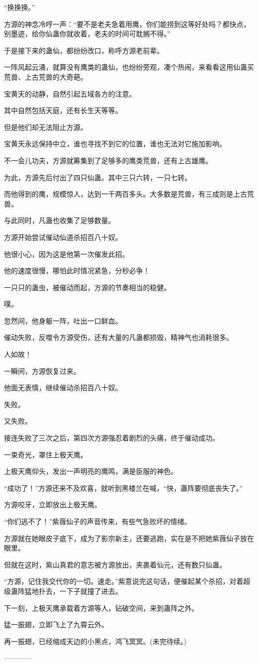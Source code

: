 \begin{this_body}
“换换换。”

方源的神念冷哼一声：“要不是老夫急着用鹰，你们能捞到这等好处吗？都快点，别墨迹，给你仙蛊你就收着，老夫的时间可耽搁不得。”

于是接下来的蛊仙，都纷纷改口，称呼方源老前辈。

一阵风起云涌，就算没有鹰类的蛊仙，也纷纷旁观，凑个热闹，来看看这用仙蛊买荒兽、上古荒兽的大奇葩。

宝黄天的动静，自然引起五域各方的注意。

其中自然包括天庭，还有长生天等等。

但是他们却无法阻止方源。

宝黄天永远保持中立，谁也寻找不到它的位置，谁也无法对它施加影响。

不一会儿功夫，方源就筹集到了足够多的鹰类荒兽，还有上古雄鹰。

为此，方源先后付出了四只仙蛊。其中三只六转，一只七转。

而他得到的鹰，规模惊人，达到一千两百多头。大多数是荒兽，有三成则是上古荒兽。

与此同时，凡蛊也收集了足够数量。

方源开始尝试催动仙道杀招百八十奴。

他很小心，因为这是他第一次催发此招。

他的速度很慢，哪怕此时情况紧急，分秒必争！

一只只的蛊虫，被催动而起，方源的节奏相当的稳健。

噗。

忽然间，他身躯一阵，吐出一口鲜血。

催动失败，反噬令方源受伤，还有大量的凡蛊都损毁，精神气也消耗很多。

人如故！

一瞬间，方源恢复过来。

他面无表情，继续催动杀招百八十奴。

失败。

又失败。

接连失败了三次之后，第四次方源强忍着剧烈的头痛，终于催动成功。

一束奇光，罩住上极天鹰。

上极天鹰仰头，发出一声明亮的鹰鸣，满是臣服的神色。

“成功了！”方源还来不及欢喜，就听到黑楼兰在喊，“快，蛊阵要彻底丧失了。”

方源咬牙，立即放出上极天鹰。

“你们逃不了！”紫薇仙子的声音传来，有些气急败坏的情绪。

方源就在她眼皮子底下，成为了影宗新主，还要逃跑，实在是不把她紫薇仙子放在眼里。

但就在这时，紫山真君的意志被方源放出，夹裹着仙元，还有数只仙蛊。

“方源，记住我交代你的一切。速走。”紫意说完这句话，便催起某个杀招，对着超级蛊阵猛地扑去，一下子就撞了进去。

下一刻，上极天鹰承载着方源等人，钻破空间，来到蛊阵之外。

猛一振翅，立即飞上了九霄云外。

再一振翅，已经缩成天边的小黑点，鸿飞冥冥。(未完待续。)

------------

\end{this_body}

